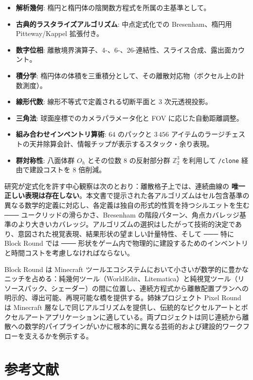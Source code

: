 \documentclass[12pt,a4paper]{scrartcl}
\newcommand{\acc}[1]{\textcolor{accent}{\textbf{#1}}}
\newcommand{\cmd}[1]{\textcolor{earth}{\texttt{\small #1}}}
\begin{document}
\begin{itemize}[leftmargin=1.3em,itemsep=0.25em,topsep=0.4em]
  \item \acc{解析幾何}: 楕円と楕円体の陰関数方程式を所属の主基準として。
  \item \acc{古典的ラスタライズアルゴリズム}: 中点定式化での Bresenham、楕円用 Pitteway/Kappel 拡張付き。
  \item \acc{数字位相}: 離散境界演算子、4-、6-、26-連結性、スライス合成、露出面カウント。
  \item \acc{積分学}: 楕円体の体積を三重積分として、その離散対応物（ボクセル上の計数測度）。
  \item \acc{線形代数}: 線形不等式で定義される切断平面と 3 次元透視投影。
  \item \acc{三角法}: 球面座標でのカメラパラメータ化と FOV に応じた自動距離調整。
  \item \acc{組み合わせインベントリ算術}: $64$ のパックと $3\,456$ アイテムのラージチェストの天井除算会計、情報チップが表示するスタック・余り表現。
  \item \acc{群対称性}: 八面体群 $O_h$ とその位数 $8$ の反射部分群 $\mathbb{Z}_2^3$ を利用して \cmd{/clone} 経由で建設コストを $8$ 倍削減。
\end{itemize}

研究が定式化を許す中心観察は次のとおり：離散格子上では、連続曲線の \acc{唯一正しい表現は存在しない}。本文書で提示された各アルゴリズムはセル包含基準の異なる数学的定義に対応し、各定義は独自の形式的性質を持つシルエットを生む ─── ユークリッドの滑らかさ、Bresenham の階段パターン、角点カバレッジ基準のより大きいカバレッジ。アルゴリズムの選択はしたがって技術的決定であり、意図された視覚表現、結果形状の望ましい計量特性、そして ─── 特に Block Round では ─── 形状をゲーム内で物理的に建設するためのインベントリと時間コストを考慮しなければならない。

Block Round は Minecraft ツールエコシステムにおいて小さいが数学的に豊かなニッチを占める：純幾何ツール（WorldEdit、Litematica）と純視覚ツール（リソースパック、シェーダー）の間に位置し、連続方程式から離散配置プランへの明示的、導出可能、再現可能な橋を提供する。姉妹プロジェクト Pixel Round は Minecraft 層なしで同じアルゴリズムを提供し、伝統的なピクセルアートとボクセルアートアプリケーションに適している。両プロジェクトは同じ連続から離散への数学的パイプラインがいかに根本的に異なる芸術的および建設的ワークフローを支えるかを例示する。

\section*{\color{accent}参考文献}
\label{sec:bib}
\end{document}
